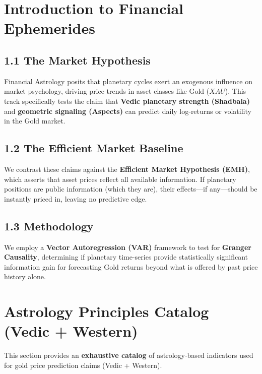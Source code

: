 \documentclass[
  11pt,
  a4paper,
  oneside,
  openany]{article}
\begin{document}
\section{Introduction to Financial
Ephemerides}\label{introduction-to-financial-ephemerides}

\subsection{1.1 The Market Hypothesis}\label{the-market-hypothesis}

Financial Astrology posits that planetary cycles exert an exogenous
influence on market psychology, driving price trends in asset classes
like Gold (\(XAU\)). This track specifically tests the claim that
\textbf{Vedic planetary strength (Shadbala)} and \textbf{geometric
signaling (Aspects)} can predict daily log-returns or volatility in the
Gold market.

\subsection{1.2 The Efficient Market
Baseline}\label{the-efficient-market-baseline}

We contrast these claims against the \textbf{Efficient Market Hypothesis
(EMH)}, which asserts that asset prices reflect all available
information. If planetary positions are public information (which they
are), their effects---if any---should be instantly priced in, leaving no
predictive edge.

\subsection{1.3 Methodology}\label{methodology}

We employ a \textbf{Vector Autoregression (VAR)} framework to test for
\textbf{Granger Causality}, determining if planetary time-series provide
statistically significant information gain for forecasting Gold returns
beyond what is offered by past price history alone.

\section{Astrology Principles Catalog (Vedic +
Western)}\label{astrology-principles-catalog-vedic-western}

This section provides an \textbf{exhaustive catalog} of astrology‑based
indicators used for gold price prediction claims (Vedic + Western).
\end{document}
